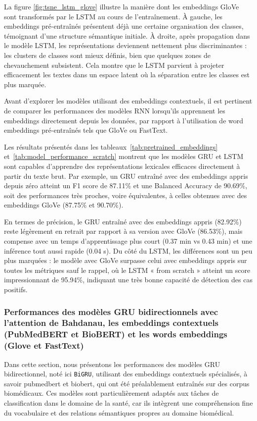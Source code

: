 \documentclass[12pt]{report}
\begin{document}
La figure \ref{fig:tsne_lstm_glove} illustre la manière dont les embeddings GloVe sont transformés par le LSTM au cours de l'entraînement. À gauche, les embeddings pré-entraînés présentent déjà une certaine organisation des classes, témoignant d’une structure sémantique initiale. À droite, après propagation dans le modèle LSTM, les représentations deviennent nettement plus discriminantes : les clusters de classes sont mieux définis, bien que quelques zones de chevauchement subsistent. Cela montre que le LSTM parvient à projeter efficacement les textes dans un espace latent où la séparation entre les classes est plus marquée.

Avant d'explorer les modèles utilisant des embeddings contextuels, il est pertinent de comparer les performances des modèles RNN lorsqu’ils apprennent les embeddings directement depuis les données, par rapport à l’utilisation de word embeddings pré-entraînés tels que GloVe ou FastText.

Les résultats présentés dans les tableaux~\ref{tab:pretrained_embeddings} et~\ref{tab:model_performance_scratch} montrent que les modèles GRU et LSTM sont capables d’apprendre des représentations lexicales efficaces directement à partir du texte brut. Par exemple, un GRU entraîné avec des embeddings appris depuis zéro atteint un F1 score de 87.11\% et une Balanced Accuracy de 90.69\%, soit des performances très proches, voire équivalentes, à celles obtenues avec des embeddings GloVe (87.75\% et 90.70\%).

En termes de précision, le GRU entraîné avec des embeddings appris (82.92\%) reste légèrement en retrait par rapport à sa version avec GloVe (86.53\%), mais compense avec un temps d’apprentissage plus court (0.37 min vs 0.43 min) et une inférence tout aussi rapide (0.04 s). Du côté du LSTM, les différences sont un peu plus marquées : le modèle avec GloVe surpasse celui avec embeddings appris sur toutes les métriques sauf le rappel, où le LSTM « from scratch » atteint un score impressionnant de 95.94\%, indiquant une très bonne capacité de détection des cas positifs.

\subsubsection{Performances des modèles GRU bidirectionnels avec l'attention de Bahdanau, les embeddings contextuels (PubMedBERT et BioBERT) et les words embeddings (Glove et FastText)}

Dans cette section, nous présentons les performances des modèles GRU bidirectionnel, noté ici \texttt{BiGRU}, utilisant des embeddings contextuels spécialisés, à savoir \gls{pubmedbert} et \gls{biobert}, qui ont été préalablement entraînés sur des corpus biomédicaux. Ces modèles sont particulièrement adaptés aux tâches de classification dans le domaine de la santé, car ils intègrent une compréhension fine du vocabulaire et des relations sémantiques propres au domaine biomédical.
\end{document}
